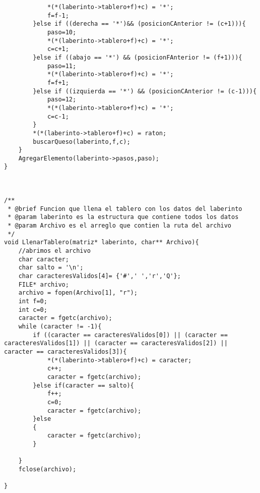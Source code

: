 \begin{verbatim}
            *(*(laberinto->tablero+f)+c) = '*';
            f=f-1;
        }else if ((derecha == '*')&& (posicionCAnterior != (c+1))){
            paso=10;
            *(*(laberinto->tablero+f)+c) = '*';
            c=c+1;
        }else if ((abajo == '*') && (posicionFAnterior != (f+1))){
            paso=11;
            *(*(laberinto->tablero+f)+c) = '*';
            f=f+1;
        }else if ((izquierda == '*') && (posicionCAnterior != (c-1))){
            paso=12;
            *(*(laberinto->tablero+f)+c) = '*';
            c=c-1;
        }    
        *(*(laberinto->tablero+f)+c) = raton;
        buscarQueso(laberinto,f,c);
    }
    AgregarElemento(laberinto->pasos,paso);
}



/**
 * @brief Funcion que llena el tablero con los datos del laberinto
 * @param laberinto es la estructura que contiene todos los datos
 * @param Archivo es el arreglo que contien la ruta del archivo
 */
void LlenarTablero(matriz* laberinto, char** Archivo){
    //abrimos el archivo
    char caracter;
    char salto = '\n';
    char caracteresValidos[4]= {'#',' ','r','Q'};
    FILE* archivo;
    archivo = fopen(Archivo[1], "r");
    int f=0;
    int c=0;
    caracter = fgetc(archivo);
    while (caracter != -1){
        if ((caracter == caracteresValidos[0]) || (caracter == caracteresValidos[1]) || (caracter == caracteresValidos[2]) || caracter == caracteresValidos[3]){
            *(*(laberinto->tablero+f)+c) = caracter;
            c++;
            caracter = fgetc(archivo);
        }else if(caracter == salto){
            f++;
            c=0;
            caracter = fgetc(archivo);
        }else
        {
            caracter = fgetc(archivo);
        }
        
    }
    fclose(archivo);  

}


\end{verbatim}
